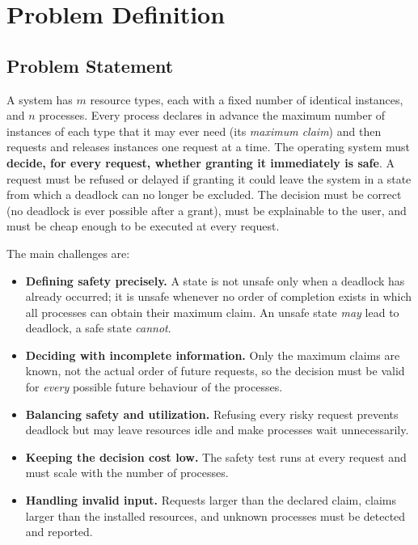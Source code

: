 \documentclass[11pt,a4paper]{report}
\begin{document}
\section{Problem Definition}
\subsection{Problem Statement}
A system has $m$ resource types, each with a fixed number of identical instances, and $n$ processes. Every process declares in advance the maximum number of instances of each type that it may ever need (its \emph{maximum claim}) and then requests and releases instances one request at a time. The operating system must \textbf{decide, for every request, whether granting it immediately is safe}. A request must be refused or delayed if granting it could leave the system in a state from which a deadlock can no longer be excluded. The decision must be correct (no deadlock is ever possible after a grant), must be explainable to the user, and must be cheap enough to be executed at every request.

The main challenges are:
\begin{itemize}
    \item \textbf{Defining safety precisely.} A state is not unsafe only when a deadlock has already occurred; it is unsafe whenever no order of completion exists in which all processes can obtain their maximum claim. An unsafe state \emph{may} lead to deadlock, a safe state \emph{cannot}.
    \item \textbf{Deciding with incomplete information.} Only the maximum claims are known, not the actual order of future requests, so the decision must be valid for \emph{every} possible future behaviour of the processes.
    \item \textbf{Balancing safety and utilization.} Refusing every risky request prevents deadlock but may leave resources idle and make processes wait unnecessarily.
    \item \textbf{Keeping the decision cost low.} The safety test runs at every request and must scale with the number of processes.
    \item \textbf{Handling invalid input.} Requests larger than the declared claim, claims larger than the installed resources, and unknown processes must be detected and reported.
\end{itemize}
\end{document}
